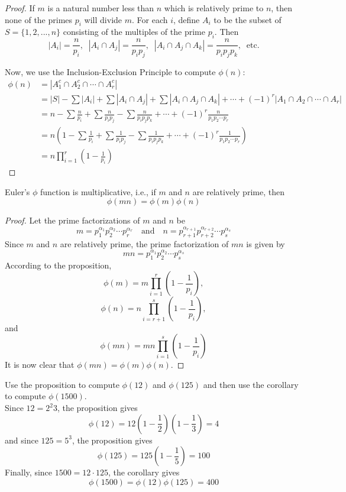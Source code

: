 \documentclass[handout]{ximera}
\begin{document}
\begin{proof}
If $m$ is a natural number less than $n$ which is relatively prime to $n$, 
then none of the primes $p_i$ will divide $m$.
For each $i$, define 
$A_i$ to be the subset of $S = \{1, 2, ..., n\}$ consisting of the multiples of the prime $p_i$.
Then
\[
|A_i| = \frac{n}{p_i}, \;\;|A_i \cap A_j| = \frac{n}{p_i p_j}, \;\;|A_i \cap A_j \cap A_k| = \frac{n}{p_i p_jp_k}, \;\;\text{etc.}
\]

Now, we use the Inclusion-Exclusion Principle to compute $\phi(n)$:
\begin{align*}
\phi(n) &= |A_1^c \cap A_2^c \cap \cdots \cap A_r^c|\\
&= |S| - \sum|A_i| + \sum|A_i \cap A_j| + \sum|A_i \cap A_j \cap A_k| + \cdots + (-1)^r|A_1 \cap A_2 \cap \cdots \cap A_r|\\[7pt]
&= n - \sum \frac{n}{p_i} + \sum \frac{n}{p_ip_j} - \sum \frac{n}{p_ip_jp_k} + \cdots + (-1)^r \frac{n}{p_1p_2 \cdots p_r}\\[7pt]
&= n\left(1 - \sum \frac{1}{p_i} + \sum \frac{1}{p_ip_j} - \sum \frac{1}{p_ip_jp_k} + \cdots + (-1)^r \frac{1}{p_1p_2 \cdots p_r} \right)\\[7pt]
&= n \prod_{i = 1}^r \left(1 - \frac{1}{p_i}\right)
\end{align*}
\end{proof}

\begin{corollary}
Euler's $\phi$ function is multiplicative, i.e., if $m$ and $n$ are relatively prime, then
\[
\phi(mn) = \phi(m)\phi(n)
\]
\end{corollary}
\begin{proof}
Let the prime factorizations of $m$ and $n$ be
\[
m = p_1^{\alpha_1} p_2^{\alpha_2}\cdots p_r^{\alpha_r} \quad \text{and} \quad n = p_{r+1}^{\alpha_{r+1}} p_{r+2}^{\alpha_{r+2}}\cdots p_s^{\alpha_s}
\]
Since $m$ and $n$ are relatively prime, the prime factorization of $mn$ is given by
\[
mn = p_1^{\alpha_1} p_2^{\alpha_2}\cdots p_s^{\alpha_s}
\]
According to the proposition,
\[
\phi(m) = m \prod_{i = 1}^r \left(1 - \frac{1}{p_i}\right),
\]
\[
\phi(n) = n \prod_{i = r+1}^s \left(1 - \frac{1}{p_i}\right),
\]
and
\[
\phi(mn) = mn \prod_{i = 1}^s \left(1 - \frac{1}{p_i}\right)
\]
It is now clear that $\phi(mn) = \phi(m) \phi(n)$.
\end{proof}

\begin{example}[example 4]
Use the proposition to compute $\phi(12)$ and $\phi(125)$ and then use the corollary to compute $\phi(1500)$.\\
Since $12 = 2^2 3$, the proposition gives
\[
\phi(12) = 12\left(1-\frac12\right)\left(1-\frac13\right) = 4
\]
and since $125 = 5^3$, the proposition gives
\[
\phi(125) = 125\left(1-\frac15\right) = 100
\]
Finally, since $1500 = 12 \cdot 125$, the corollary gives
\[
\phi(1500) = \phi(12)\phi(125) = 400
\]
\end{example}
\end{document}
